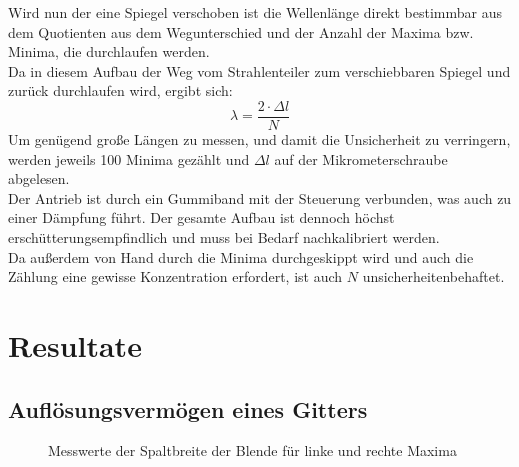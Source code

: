 \documentclass[12pt,a4paper]{article}
\begin{document}
\begin{multicols}{2}
Wird nun der eine Spiegel verschoben ist die Wellenlänge direkt bestimmbar aus dem Quotienten aus dem Wegunterschied und der Anzahl der Maxima bzw. Minima, die durchlaufen werden.\\
Da in diesem Aufbau der Weg vom Strahlenteiler zum verschiebbaren Spiegel und zurück durchlaufen wird, ergibt sich:
$$\lambda = \frac{2\cdot \Delta l}{N}$$
Um genügend große Längen zu messen, und damit die Unsicherheit zu verringern, werden jeweils 100 Minima gezählt und $\Delta l$ auf der Mikrometerschraube abgelesen.\\
Der Antrieb ist durch ein Gummiband mit der Steuerung verbunden, was auch zu einer Dämpfung führt. Der gesamte Aufbau ist dennoch höchst erschütterungsempfindlich und muss bei Bedarf nachkalibriert werden.\\
Da außerdem von Hand durch die Minima durchgeskippt wird und auch die Zählung eine gewisse Konzentration erfordert, ist auch $N$ unsicherheitenbehaftet.



\section{Resultate}
\subsection{Auflösungsvermögen eines Gitters}


\begin{figure}[H]
	\centering
	\caption{Messwerte der Spaltbreite der Blende für linke und rechte Maxima}
	\label{tab:blendenbreite}
\end{figure}




\end{multicols}
\end{document}
